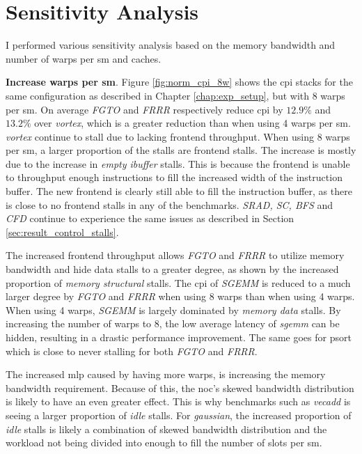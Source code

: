 \section{Sensitivity Analysis}

I performed various sensitivity analysis based on the memory bandwidth and number of warps per \acrshort{sm} and caches.

\vspace{1mm}\noindent
\textbf{Increase warps per \acrshort{sm}}. Figure \ref{fig:norm_cpi_8w} shows the \acrshort{cpi} stacks for the same configuration as described in Chapter \ref{chap:exp_setup}, but with 8 warps per \acrshort{sm}. On average \textit{FGTO} and \textit{FRRR} respectively reduce \acrshort{cpi} by $12.9\%$ and $13.2\%$ over \textit{\Gls{vortex}}, which is a greater reduction than when using 4 warps per \acrshort{sm}. \textit{\Gls{vortex}} continue to stall due to lacking frontend throughput. When using 8 warps per \acrshort{sm}, a larger proportion of the stalls are frontend stalls. The increase is mostly due to the increase in \textit{empty ibuffer} stalls. This is because the frontend is unable to throughput enough instructions to fill the increased width of the instruction buffer. The new frontend is clearly still able to fill the instruction buffer, as there is close to no frontend stalls in any of the benchmarks. \textit{SRAD, SC, BFS} and \textit{CFD} continue to experience the same issues as described in Section \ref{sec:result_control_stalls}. 

The increased frontend throughput allows \textit{FGTO} and \textit{FRRR} to utilize memory bandwidth and hide data stalls to a greater degree, as shown by the increased proportion of \textit{memory structural} stalls. The \acrshort{cpi} of \textit{SGEMM} is reduced to a much larger degree by \textit{FGTO} and \textit{FRRR} when using 8 warps than when using 4 warps. When using 4 warps, \textit{SGEMM} is largely dominated by \textit{memory data} stalls. By increasing the number of warps to 8, the low average latency of \textit{sgemm} can be hidden, resulting in a drastic performance improvement. The same goes for psort which is close to never stalling for both \textit{FGTO} and \textit{FRRR}.

The increased \acrshort{mlp} caused by having more warps, is increasing the memory bandwidth requirement. Because of this, the \acrshort{noc}'s skewed bandwidth distribution is likely to have an even greater effect. This is why benchmarks such as \textit{vecadd} is seeing a larger proportion of \textit{idle} stalls. For \textit{gaussian}, the increased proportion of \textit{idle} stalls is likely a combination of skewed bandwidth distribution and the workload not being divided into enough  to fill the number of slots per \acrshort{sm}.   

